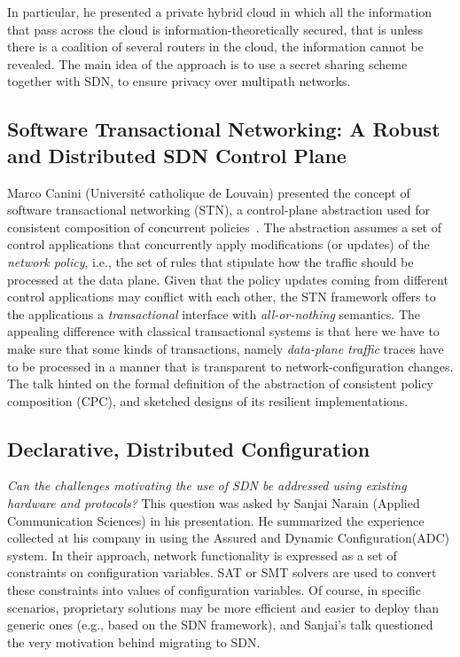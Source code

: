 \documentclass[11pt,pdftex,letter]{article}
\begin{document}
In particular, he presented a private hybrid cloud in which all the information that pass across the cloud is information-theoretically
secured, that is unless there is a coalition of several routers in the cloud, the information cannot be revealed. 
The main idea of the approach is to use a
secret sharing scheme together with SDN, to ensure privacy over multipath networks.


\subsection{Software Transactional Networking: A Robust and
  Distributed SDN Control Plane}

Marco Canini (Universit\'{e} catholique de Louvain) presented the concept of software transactional
networking (STN), a control-plane abstraction used for consistent
composition of concurrent policies~\cite{stn}. The abstraction assumes a set of
control applications that concurrently apply modifications (or
updates) of the
\emph{network policy}, i.e., the set of rules that stipulate how the
traffic should be processed at the data plane.
Given that the policy updates coming from different control applications may
conflict with each other, the STN framework offers to the applications
a \emph{transactional} interface with \emph{all-or-nothing} semantics.
The appealing difference with classical transactional systems is that
here we have to make sure that some kinds of transactions, namely
\emph{data-plane traffic} traces have to be processed in a manner that
is transparent to network-configuration changes.
The talk hinted on the formal definition of the abstraction of consistent policy
composition (CPC), and sketched designs of its resilient implementations.

\subsection{Declarative, Distributed Configuration}

\emph{Can the challenges motivating the use of SDN be addressed using
existing hardware and protocols?} This question was  asked
by Sanjai Narain (Applied Communication Sciences) in his presentation.
He 
summarized the
experience collected at his company in using the Assured and Dynamic
Configuration(ADC) system. In their approach, network functionality is
expressed as a set of constraints on configuration variables. SAT or
SMT solvers are used to convert these constraints into values of configuration variables.
Of course, in specific scenarios, proprietary solutions may be more
efficient and  easier to deploy than generic ones (e.g., based on the
SDN framework), and Sanjai's talk questioned the very
motivation behind migrating to SDN.
\end{document}
